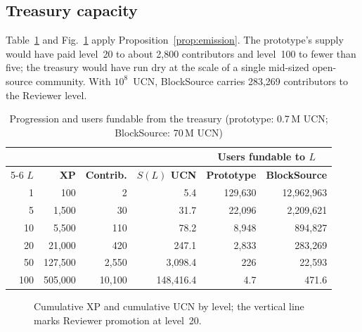 \documentclass[conference]{IEEEtran}
\begin{document}
\subsection{Treasury capacity}
Table~\ref{tab:prog} and Fig.~\ref{fig:prog} apply Proposition~\ref{prop:emission}. The prototype's supply would have paid level~20 to about 2{,}800 contributors and level~100 to fewer than five; the treasury would have run dry at the scale of a single mid-sized open-source community. With $10^{8}$~UCN, BlockSource carries 283{,}269 contributors to the Reviewer level.

\begin{table}[t]
\centering
\caption{Progression and users fundable from the treasury (prototype: 0.7\,M UCN; BlockSource: 70\,M UCN)}
\label{tab:prog}
\footnotesize
\setlength{\tabcolsep}{2.6pt}
\begin{tabular}{@{}rrrrrr@{}}
\toprule
& & & & \multicolumn{2}{c}{\textbf{Users fundable to $L$}}\\
\cmidrule(l){5-6}
\textbf{$L$} & \textbf{XP} & \textbf{Contrib.} & \textbf{$S(L)$ UCN} & \textbf{Prototype} & \textbf{BlockSource}\\
\midrule
1 & 100 & 2 & 5.4 & 129{,}630 & 12{,}962{,}963\\
5 & 1{,}500 & 30 & 31.7 & 22{,}096 & 2{,}209{,}621\\
10 & 5{,}500 & 110 & 78.2 & 8{,}948 & 894{,}827\\
20 & 21{,}000 & 420 & 247.1 & 2{,}833 & 283{,}269\\
50 & 127{,}500 & 2{,}550 & 3{,}098.4 & 226 & 22{,}593\\
100 & 505{,}000 & 10{,}100 & 148{,}416.4 & 4.7 & 471.6\\
\bottomrule
\end{tabular}
\end{table}

\begin{figure}[t]
\centering
{}
\caption{Cumulative XP and cumulative UCN by level; the vertical line marks Reviewer promotion at level~20.}
\label{fig:prog}
\end{figure}
\end{document}
